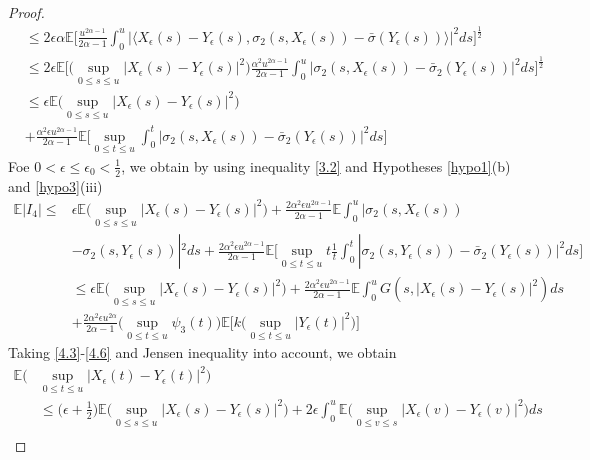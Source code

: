 \documentclass[a4 paper, 12pt]{report}
\theoremstyle{plain}
\begin{document}
\begin{proof}
\begin{align*}
&\leq 2\epsilon\alpha\mathbb{E}\bigg[\frac{u^{2\alpha-1}}{2\alpha - 1}\int_0^u|\langle X_\epsilon(s) - Y_\epsilon(s),\sigma_2(s,X_\epsilon(s)) - \bar{\sigma}(Y_\epsilon(s))\rangle|^2ds\bigg]^{\frac{1}{2}}\\
&\leq 2\epsilon\mathbb{E}\bigg[\bigg(\sup_{0\leq s\leq u}|X_\epsilon(s) - Y_\epsilon(s)|^2\bigg)\frac{\alpha^2u^{2\alpha-1}}{2\alpha-1}\int_0^u|\sigma_2(s,X_\epsilon(s)) - \bar{\sigma}_2(Y_\epsilon(s))|^2ds\bigg]^{\frac{1}{2}}\\
&\leq \epsilon\mathbb{E}\bigg(\sup_{0\leq s\leq u}|X_\epsilon(s) - Y_\epsilon(s)|^2\bigg)\\
&+\frac{\alpha^2\epsilon u^{2\alpha-1}}{2\alpha - 1}\mathbb{E}\bigg[\sup_{0\leq t\leq u}\int_0^t|\sigma_2(s,X_\epsilon(s)) - \bar{\sigma}_2(Y_\epsilon(s))|^2ds\bigg]
\end{align*}
Foe $0<\epsilon\leq \epsilon_0<\frac{1}{2}$, we obtain by using inequality \eqref{3.2} and Hypotheses \ref{hypo1}(b) and \ref{hypo3}(iii)
\begin{equation}\label{4.6}
\begin{split}
\mathbb{E}|I_4|\leq &\epsilon\mathbb{E}\bigg(\sup_{0\leq s\leq u}|X_\epsilon(s) - Y_\epsilon(s)|^2\bigg)+\frac{2\alpha^2\epsilon u^{2\alpha-1}}{2\alpha-1}\mathbb{E}\int_0^u|\sigma_2(s,X_\epsilon(s))\\
&-\sigma_2(s,Y_\epsilon(s))|^2ds+\frac{2\alpha^2\epsilon u^{2\alpha-1}}{2\alpha -1}\mathbb{E}\bigg[\sup_{0\leq t\leq u}t\frac{1}{t}\int_0^t|\sigma_2(s,Y_\epsilon(s)) - \bar{\sigma}_2(Y_\epsilon(s))|^2ds\bigg]\\
&\leq \epsilon\mathbb{E}\bigg(\sup_{0\leq s\leq u}|X_\epsilon(s) - Y_\epsilon(s)|^2\bigg)+\frac{2\alpha^2\epsilon u^{2\alpha-1}}{2\alpha-1}\mathbb{E}\int_0^u G(s,|X_\epsilon(s) - Y_\epsilon(s)|^2)ds\\
&+\frac{2\alpha^2\epsilon u^{2\alpha}}{2\alpha - 1}\bigg(\sup_{0\leq t\leq u}\psi_3(t)\bigg)\mathbb{E}\bigg[k\bigg(\sup_{0\leq t\leq u}|Y_\epsilon(t)|^2\bigg)\bigg]
\end{split}
\end{equation}
Taking \eqref{4.3}-\eqref{4.6} and Jensen inequality into account, we obtain
\begin{align*}
\mathbb{E}\bigg(&\sup_{0\leq t\leq u}|X_\epsilon(t) - Y_\epsilon(t)|^2\bigg)\\
&\leq\bigg(\epsilon+\frac{1}{2}\bigg)\mathbb{E}\bigg(\sup_{0\leq s\leq u}|X_\epsilon(s) - Y_\epsilon(s)|^2\bigg)+2\epsilon\int_0^u\mathbb{E}\bigg(\sup_{0\leq v\leq s}|X_\epsilon(v) - Y_\epsilon(v)|^2\bigg)ds\\

\end{align*}
\end{proof}
\end{document}
